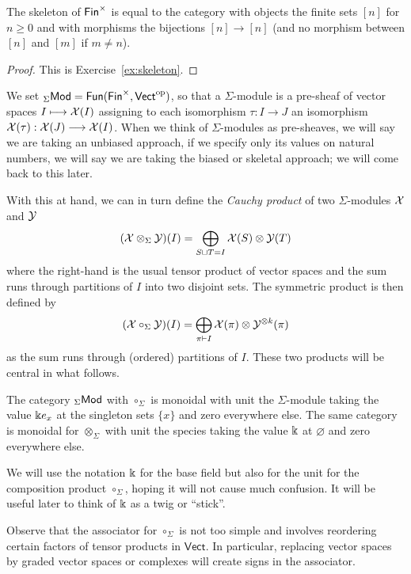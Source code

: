 \begin{lemma} The skeleton of $\mathsf{Fin}^\times$ is
equal to the category with objects the finite sets
$[n]$ for $n\geqslant 0$ and with morphisms the
bijections $[n]\longrightarrow [n]$ (and no morphism
between $[n]$ and $[m]$ if $m\neq n$).
\end{lemma}

\begin{proof}
This is Exercise~\ref{ex:skeleton}.
\end{proof}

We set ${}_\Sigma\mathsf{Mod}  = 
\mathsf{Fun}(\mathsf{Fin}^\times,\mathsf{Vect}^{\mathrm{op}})$,
so that a $\Sigma$-module is a pre-sheaf of vector
spaces $I\longmapsto \mathcal{X}(I)$ assigning to each
isomorphism $\tau : I\longrightarrow J$ an isomorphism
$\mathcal{X}(\tau): \mathcal{X}(J)\longrightarrow \mathcal{X}(I)$. When we
think of $\Sigma$-modules as pre-sheaves, we will say we 
are taking an unbiased approach, if we specify only
its values on natural numbers, we will say we are taking the
biased or skeletal approach; we will come back to this later.

With this at hand, 
we can in turn define the \emph{Cauchy product}
of two $\Sigma$-modules $\mathcal{X}$ and $\mathcal{Y}$
\[ (\mathcal{X}\otimes_\Sigma \mathcal{Y})(I) = 
 	\bigoplus_{S\sqcup T= I}
 		 \mathcal{X}(S)\otimes \mathcal{Y}(T)\] 
where the right-hand is the usual tensor product of
vector spaces
and the sum runs through partitions of $I$ into
two disjoint sets. The symmetric product is then
defined by 
\[ (\mathcal{X}\circ_\Sigma \mathcal{Y})(I) 
 	= \bigoplus_{\pi \vdash I} \mathcal{X}(\pi) 
 		\otimes \mathcal{Y}^{\otimes k}(\pi)\] 
as the sum runs through (ordered) partitions of $I$.
These two products will be central in what follows.

\begin{lemma}
The category ${}_\Sigma\mathsf{Mod}$ with $\circ_\Sigma$ is
monoidal with unit the $\Sigma$-module taking the value $\Bbbk e_x$ at 
the singleton sets $\{x\}$ and zero everywhere else. The same
category is monoidal for $\otimes_\Sigma$ with unit
the species taking the value $\Bbbk$ at $\varnothing$
and zero everywhere else.
\end{lemma}

We will use the notation $\Bbbk$ for the base field but
also for the unit for the composition product $\circ_\Sigma$,
hoping it will not cause much confusion. It will be useful 
later to think of $\Bbbk$ as a twig or ``stick''.

Observe that the associator for $\circ_\Sigma$ is
not too simple and involves reordering certain
factors of tensor products in $\mathsf{Vect}$. In
particular, replacing vector spaces by graded vector
spaces or complexes will create signs in the
associator.

